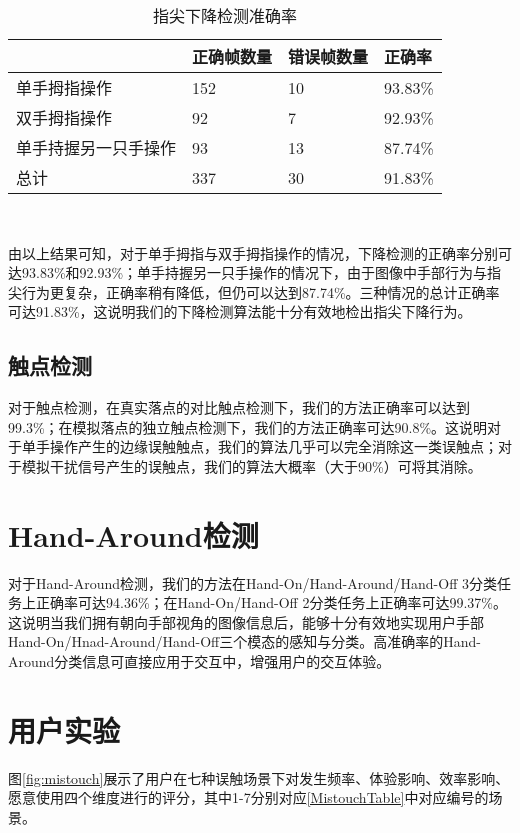 \begin{table}[htbp]
\centering
\caption{指尖下降检测准确率}
\label{tbl:fingertip_movement}
\begin{tabular}{p{130 pt}|p{60 pt}p{60 pt}p{60 pt}}
 \toprule
    & 正确帧数量 & 错误帧数量 & 正确率\\
 \midrule
    单手拇指操作 & 152 & 10 & 93.83\% \\
    双手拇指操作 & 92 & 7 & 92.93\% \\
    单手持握另一只手操作 & 93 & 13 & 87.74\% \\
\midrule        
    总计 & 337 & 30 & 91.83\% \\
\bottomrule
 \end{tabular}\\[2pt]
\end{table}

由以上结果可知，对于单手拇指与双手拇指操作的情况，下降检测的正确率分别可达93.83\%和92.93\%；单手持握另一只手操作的情况下，由于图像中手部行为与指尖行为更复杂，正确率稍有降低，但仍可以达到87.74\%。三种情况的总计正确率可达91.83\%，这说明我们的下降检测算法能十分有效地检出指尖下降行为。

\subsection{触点检测}
对于触点检测，在真实落点的对比触点检测下，我们的方法正确率可以达到99.3\%；在模拟落点的独立触点检测下，我们的方法正确率可达90.8\%。这说明对于单手操作产生的边缘误触触点，我们的算法几乎可以完全消除这一类误触点；对于模拟干扰信号产生的误触点，我们的算法大概率（大于90\%）可将其消除。

\section{Hand-Around检测}
对于Hand-Around检测，我们的方法在Hand-On/Hand-Around/Hand-Off 3分类任务上正确率可达94.36\%；在Hand-On/Hand-Off 2分类任务上正确率可达99.37\%。这说明当我们拥有朝向手部视角的图像信息后，能够十分有效地实现用户手部Hand-On/Hnad-Around/Hand-Off三个模态的感知与分类。高准确率的Hand-Around分类信息可直接应用于交互中，增强用户的交互体验。

\section{用户实验}

图\ref{fig:mistouch}展示了用户在七种误触场景下对发生频率、体验影响、效率影响、愿意使用四个维度进行的评分，其中1-7分别对应\ref{MistouchTable}中对应编号的场景。

